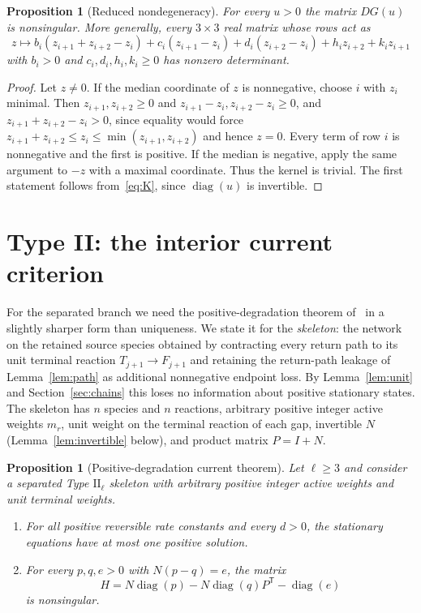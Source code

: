 \documentclass[11pt,a4paper]{article}
\theoremstyle{plain}
\newtheorem{proposition}[theorem]{Proposition}
\theoremstyle{definition}
\theoremstyle{remark}
\numberwithin{equation}{section}
\newcommand{\diag}{\operatorname{diag}}
\newcommand{\II}{\mathrm{II}}
\begin{document}
\begin{proposition}[Reduced nondegeneracy]\label{prop:tangent}
For every $u>0$ the matrix $DG(u)$ is nonsingular. More generally, every $3\times3$ real matrix whose rows act as
\[
z\mapsto b_i(z_{i+1}+z_{i+2}-z_i)+c_i(z_{i+1}-z_i)+d_i(z_{i+2}-z_i)+h_iz_{i+2}+k_iz_{i+1}
\]
with $b_i>0$ and $c_i,d_i,h_i,k_i\ge0$ has nonzero determinant.
\end{proposition}

\begin{proof}
Let $z\neq0$. If the median coordinate of $z$ is nonnegative, choose $i$ with $z_i$ minimal. Then $z_{i+1},z_{i+2}\ge0$ and $z_{i+1}-z_i,z_{i+2}-z_i\ge0$, and $z_{i+1}+z_{i+2}-z_i>0$, since equality would force $z_{i+1}+z_{i+2}\le z_i\le\min(z_{i+1},z_{i+2})$ and hence $z=0$. Every term of row $i$ is nonnegative and the first is positive. If the median is negative, apply the same argument to $-z$ with a maximal coordinate. Thus the kernel is trivial. The first statement follows from~\eqref{eq:K}, since $\diag(u)$ is invertible.
\end{proof}

\section{Type II: the interior current criterion}\label{sec:interior}

For the separated branch we need the positive-degradation theorem of~\cite{TypeIIpos} in a slightly sharper form than uniqueness. We state it for the \emph{skeleton}: the network on the retained source species obtained by contracting every return path to its unit terminal reaction $T_{j+1}\to F_{j+1}$ and retaining the return-path leakage of Lemma~\ref{lem:path} as additional nonnegative endpoint loss. By Lemma~\ref{lem:unit} and Section~\ref{sec:chains} this loses no information about positive stationary states. The skeleton has $n$ species and $n$ reactions, arbitrary positive integer active weights $m_r$, unit weight on the terminal reaction of each gap, invertible $N$ (Lemma~\ref{lem:invertible} below), and product matrix $P=I+N$.

\begin{proposition}[Positive-degradation current theorem]\label{prop:interior}
Let $\ell\ge3$ and consider a separated Type $\II_\ell$ skeleton with arbitrary positive integer active weights and unit terminal weights.
\begin{enumerate}[label=\textup{(\roman*)}]
\item For all positive reversible rate constants and every $d>0$, the stationary equations have at most one positive solution.
\item For every $p,q,e>0$ with $N(p-q)=e$, the matrix
\begin{equation}\label{eq:H}
H=N\diag(p)-N\diag(q)P^{\mathsf T}-\diag(e)
\end{equation}
is nonsingular.
\end{enumerate}
\end{proposition}
\end{document}
